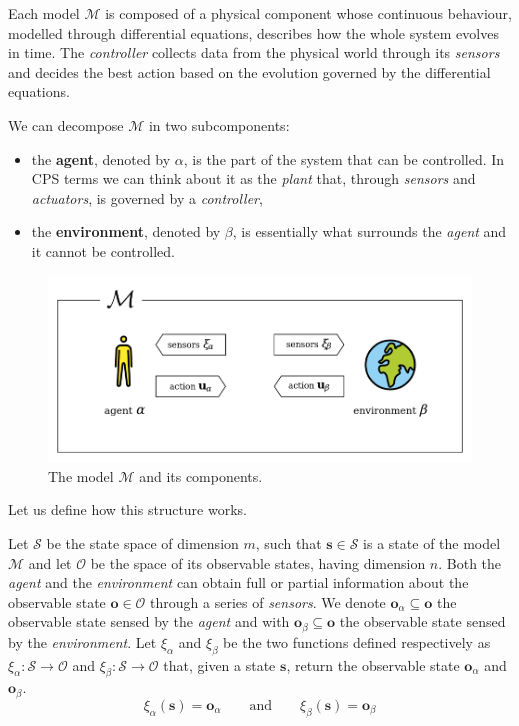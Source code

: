Each model $\mathcal{M}$ is composed of a physical component whose continuous behaviour, modelled through differential equations, describes how the whole system evolves in time.
The \textit{controller} collects data from the physical world through its \textit{sensors} and decides the best action based on the evolution governed by the differential equations.

We can decompose $\mathcal{M}$ in two subcomponents:
\begin{itemize}
  \item the \textbf{agent}, denoted by $\alpha$, is the part of the system that can be controlled. In CPS terms we can think about it as the \textit{plant} that, through \textit{sensors} and \textit{actuators}, is governed by a \textit{controller},
  \item the \textbf{environment}, denoted by $\beta$, is essentially what surrounds the \textit{agent} and it cannot be controlled.
\end{itemize}

\begin{figure}[H]
	\centering
	\includegraphics[width=12cm, keepaspectratio]{img/3_1_model.png.png}
	\caption{The model $\mathcal{M}$ and its components.}
\end{figure}

Let us define how this structure works.

Let $\mathcal{S}$ be the state space of dimension $m$, such that $\textbf{s} \in \mathcal{S}$ is a state of the model $\mathcal{M}$ and let $\mathcal{O}$ be the space of its observable states, having dimension $n$.
Both the \textit{agent} and the \textit{environment} can obtain full or partial information about the observable state $\textbf{o} \in \mathcal{O}$ through a series of \textit{sensors}.
We denote $\textbf{o}_\alpha \subseteq \textbf{o}$ the observable state sensed by the \textit{agent} and with $\textbf{o}_\beta \subseteq \textbf{o}$ the observable state sensed by the \textit{environment}.
Let $\xi_\alpha$ and $\xi_\beta$ be the two functions defined respectively as $\xi_\alpha: \mathcal{S} \to \mathcal{O}$ and $\xi_\beta: \mathcal{S} \to \mathcal{O}$ that, given a state $\textbf{s}$, return the observable state $\textbf{o}_\alpha$ and $\textbf{o}_\beta$.
$$ \xi_\alpha(\textbf{s}) = \textbf{o}_\alpha
\qquad \text{and} \qquad
\xi_\beta(\textbf{s}) = \textbf{o}_\beta $$


